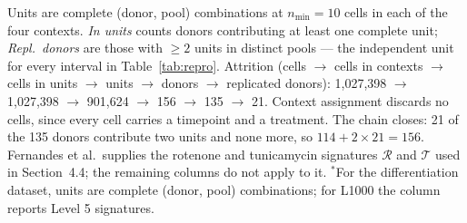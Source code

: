 \documentclass[5p,times,twocolumn]{elsarticle}
\begin{document}
\begin{table}[!htbp]
  \centering
  \caption{Cohort construction and derived unit counts.}
  \label{tab:cohort}
  \begin{minipage}{\linewidth}\footnotesize
  Units are complete (donor, pool) combinations at $n_{\min}=10$ cells in each of the four contexts. \emph{In units} counts donors contributing at least one complete unit; \emph{Repl.\ donors} are those with $\geq 2$ units in distinct pools --- the independent unit for every interval in Table~\ref{tab:repro}. Attrition (cells $\rightarrow$ cells in contexts $\rightarrow$ cells in units $\rightarrow$ units $\rightarrow$ donors $\rightarrow$ replicated donors): 1,027,398 $\rightarrow$ 1,027,398 $\rightarrow$ 901,624 $\rightarrow$ 156 $\rightarrow$ 135 $\rightarrow$ 21. Context assignment discards no cells, since every cell carries a timepoint and a treatment. The chain closes: 21 of the 135 donors contribute two units and none more, so $114 + 2\times21 = 156$. Fernandes et al.\ supplies the rotenone and tunicamycin signatures $\mathcal{R}$ and $\mathcal{T}$ used in Section~4.4; the remaining columns do not apply to it. $^{\ast}$For the differentiation dataset, units are complete (donor, pool) combinations; for L1000 the column reports Level 5 signatures.
  \end{minipage}
\end{table}
\end{document}
